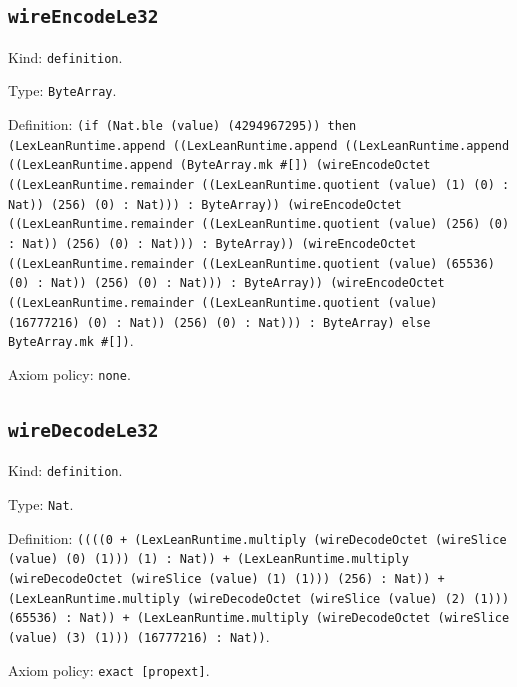 \documentclass[11pt]{article}
\begin{document}
\subsection*{\texttt{wireEncodeLe32}}
\noindent Kind: \texttt{definition}.\par
\noindent Type: \texttt{ByteArray}.\par
\noindent Definition: \texttt{(if (Nat.ble (value) (4294967295)) then (LexLeanRuntime.append ((LexLeanRuntime.append ((LexLeanRuntime.append ((LexLeanRuntime.append (ByteArray.mk \#[]) (wireEncodeOctet ((LexLeanRuntime.remainder ((LexLeanRuntime.quotient (value) (1) (0) : Nat)) (256) (0) : Nat))) : ByteArray)) (wireEncodeOctet ((LexLeanRuntime.remainder ((LexLeanRuntime.quotient (value) (256) (0) : Nat)) (256) (0) : Nat))) : ByteArray)) (wireEncodeOctet ((LexLeanRuntime.remainder ((LexLeanRuntime.quotient (value) (65536) (0) : Nat)) (256) (0) : Nat))) : ByteArray)) (wireEncodeOctet ((LexLeanRuntime.remainder ((LexLeanRuntime.quotient (value) (16777216) (0) : Nat)) (256) (0) : Nat))) : ByteArray) else ByteArray.mk \#[])}.\par
\noindent Axiom policy: \texttt{none}.\par
\subsection*{\texttt{wireDecodeLe32}}
\noindent Kind: \texttt{definition}.\par
\noindent Type: \texttt{Nat}.\par
\noindent Definition: \texttt{((((0 + (LexLeanRuntime.multiply (wireDecodeOctet (wireSlice (value) (0) (1))) (1) : Nat)) + (LexLeanRuntime.multiply (wireDecodeOctet (wireSlice (value) (1) (1))) (256) : Nat)) + (LexLeanRuntime.multiply (wireDecodeOctet (wireSlice (value) (2) (1))) (65536) : Nat)) + (LexLeanRuntime.multiply (wireDecodeOctet (wireSlice (value) (3) (1))) (16777216) : Nat))}.\par
\noindent Axiom policy: \texttt{exact [propext]}.\par
\end{document}
